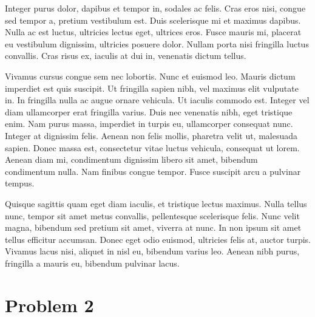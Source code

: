 \documentclass[a4paper,11pt]{article}
\begin{document}
Integer purus dolor, dapibus et tempor in, sodales ac felis. Cras eros
nisi, congue sed tempor a, pretium vestibulum est. Duis scelerisque mi
et maximus dapibus. Nulla ac est luctus, ultricies lectus eget, ultrices
 eros. Fusce mauris mi, placerat eu vestibulum dignissim, ultricies
posuere dolor. Nullam porta nisi fringilla luctus convallis. Cras risus
ex, iaculis at dui in, venenatis dictum tellus.




Vivamus cursus congue sem nec lobortis. Nunc et euismod leo. Mauris
dictum imperdiet est quis suscipit. Ut fringilla sapien nibh, vel
maximus elit vulputate in. In fringilla nulla ac augue ornare vehicula.
Ut iaculis commodo est. Integer vel diam ullamcorper erat fringilla
varius. Duis nec venenatis nibh, eget tristique enim. Nam purus massa,
imperdiet in turpis eu, ullamcorper consequat nunc. Integer at dignissim
 felis. Aenean non felis mollis, pharetra velit ut, malesuada sapien.
Donec massa est, consectetur vitae luctus vehicula, consequat ut lorem.
Aenean diam mi, condimentum dignissim libero sit amet, bibendum
condimentum nulla. Nam finibus congue tempor. Fusce suscipit arcu a
pulvinar tempus.




Quisque sagittis quam eget diam iaculis, et tristique lectus maximus.
Nulla tellus nunc, tempor sit amet metus convallis, pellentesque
scelerisque felis. Nunc velit magna, bibendum sed pretium sit amet,
viverra at nunc. In non ipsum sit amet tellus efficitur accumsan. Donec
eget odio euismod, ultricies felis at, auctor turpis. Vivamus lacus
nisi, aliquet in nisl eu, bibendum varius leo. Aenean nibh purus,
fringilla a mauris eu, bibendum pulvinar lacus.



\section*{Problem 2}

\printbibliography
\end{document}
